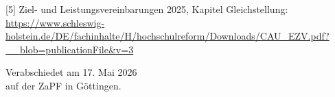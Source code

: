 \documentclass[DIV=calc]{scrartcl}
\begin{document}
[5] Ziel- und Leistungsvereinbarungen 2025, Kapitel Gleichstellung: \url{https://www.schleswig-holstein.de/DE/fachinhalte/H/hochschulreform/Downloads/CAU_EZV.pdf?__blob=publicationFile&v=3}

\vspace{1cm} 
%
\vfill
\begin{flushright}
	Verabschiedet am 17. Mai 2026 \\
	auf der ZaPF in Göttingen.
\end{flushright}
\end{document}
